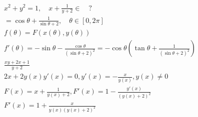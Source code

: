 \documentclass{article}
\begin{document}
\begin{align*}
    x^2+y^2 = 1, \quad x+\frac{1}{y+2} \in \quad ? \\ 
    = \cos \theta + \frac{1}{\sin \theta + 2}, \quad \theta \in [0,2\pi] \\
    f(\theta) = F(x(\theta),y(\theta)) \\
    f'(\theta) = -\sin \theta-\frac{\cos \theta}{(\sin \theta +2)^2} = -\cos \theta \left(\tan \theta+\frac{1}{(\sin \theta +2)^2} \right)\\
    \frac{xy+2x+1}{y+2}\\
    2x+2y(x)y'(x)=0, y'(x) = -\frac{x}{y(x)} , y(x) \neq 0\\
    F(x) = x + \frac{1}{y(x)+2}, F'(x) = 1-\frac{y'(x)}{(y(x)+2)^2}\\
    F'(x) = 1 + \frac{x}{y(x)(y(x)+2)^2}\\
\end{align*}

\clearpage
\end{document}
